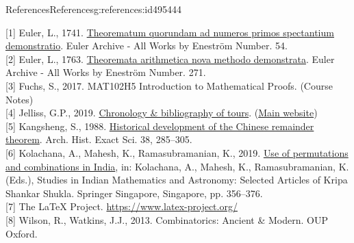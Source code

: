 \documentclass[oneside,10pt,]{book}
\numberwithin{equation}{section}
\begin{document}
\begin{references-chapter-numberless}{References}{}{References}{}{}{g:references:id495444}

\setlength{\parindent}{0em}

[1] Euler, L., 1741. \href{https://scholarlycommons.pacific.edu/euler-works/54/}{Theorematum quorundam ad numeros primos spectantium demonstratio}. Euler Archive - All Works by Eneström Number. 54. \\

[2] Euler, L., 1763. \href{https://scholarlycommons.pacific.edu/euler-works/271/}{Theoremata arithmetica nova methodo demonstrata}. Euler Archive - All Works by Eneström Number. 271. \\

[3] Fuchs, S., 2017. MAT102H5 Introduction to Mathematical Proofs. (Course Notes) \\

[4] Jelliss, G.P., 2019. \href{https://www.mayhematics.com/p/KTN12_Bibliography.pdf}{Chronology \& bibliography of tours}. (\href{https://www.mayhematics.com/p/p.htm}{Main website}) \\

[5] Kangsheng, S., 1988. \href{https://doi.org/10.1007/BF00357063}{Historical development of the Chinese remainder theorem}. Arch. Hist. Exact Sci. 38, 285–305. \\

[6] Kolachana, A., Mahesh, K., Ramasubramanian, K., 2019. \href{https://doi.org/10.1007/978-981-13-7326-8_18}{Use of permutations and combinations in India}, in: Kolachana, A., Mahesh, K., Ramasubramanian, K. (Eds.), Studies in Indian Mathematics and Astronomy: Selected Articles of Kripa Shankar Shukla. Springer Singapore, Singapore, pp. 356–376. \\

[7] The LaTeX Project. \href{https://www.latex-project.org/}{https:\slash{}\slash{}www.latex-project.org\slash{}} \\

[8] Wilson, R., Watkins, J.J., 2013. Combinatorics: Ancient \& Modern. OUP Oxford. \\

\end{references-chapter-numberless}
\end{document}
